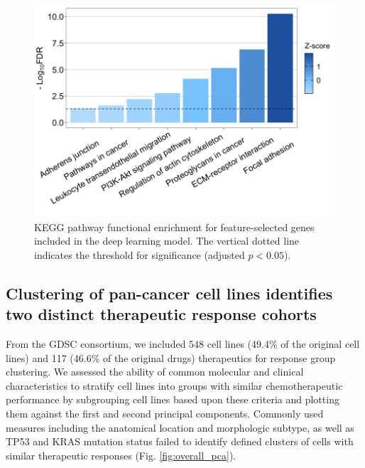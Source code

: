 \documentclass[10pt, letterpaper]{article}
\begin{document}
\begin{multicols*}{2}
\begin{figure}[!ht]
	\centering
	\includegraphics[width=\textwidth]{Figures/kegg.png}
	\caption{KEGG pathway functional enrichment for feature-selected genes included in the deep learning model. The vertical dotted line indicates the threshold for significance (adjusted $p < 0.05$).}
	\label{fig:kegg}
\end{figure}

\subsection{Clustering of pan-cancer cell lines identifies two distinct therapeutic response cohorts}
From the GDSC consortium, we included 548 cell lines (49.4\% of the original cell lines) and 117 (46.6\% of the original drugs) therapeutics for response group clustering. We assessed the ability of common molecular and clinical characteristics to stratify cell lines into groups with similar chemotherapeutic performance by subgrouping cell lines based upon these criteria and plotting them against the first and second principal components. Commonly used measures including the anatomical location and morphologic subtype, as well as TP53 and KRAS mutation status failed to identify defined clusters of cells with similar therapeutic responses (Fig. \ref{fig:overall_pca}).


\end{multicols*}
\end{document}
